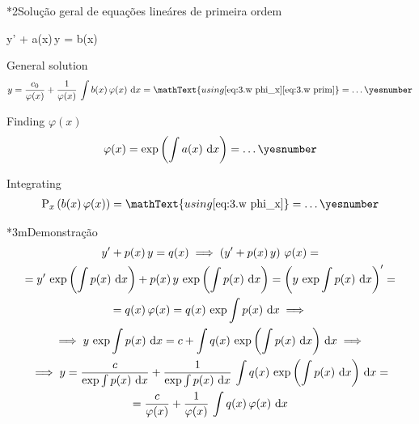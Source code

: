 \documentclass["AM3C-Slides_annotations.tex"]{subfiles}
\begin{document}
\begin{sectionBox}*2{Solução geral de equações lineáres de primeira ordem} %
  \begin{BM}
    y' + a(x)\,y = b(x)
  \end{BM}


  General solution
  \begin{gather*}
    y
    = \frac{c_0}{\varphi(x)}
    + \frac{1  }{\varphi(x)}
    \,\int{b(x)\,\varphi(x)\,\odif{x}}
    = \mathText{using 
      \eqref{eq:3.w phi_x}
      \eqref{eq:3.w prim}
    }
    = \dots
    \yesnumber\label{eq:3.w answer}
  \end{gather*}

  Finding \(\varphi(x)\)
  \begin{gather*}
    \varphi(x) 
    = \exp{\left(
        \int{a(x)\,\odif{x}}
    \right)}
    = \dots
    \yesnumber\label{eq:3.w phi_x}
  \end{gather*}

  Integrating
  \begin{gather*}
    \prim_x{\left(
        b(x)\,\varphi(x)
    \right)}
    = \mathText{using \eqref{eq:3.w phi_x}}
    = \dots
    \yesnumber\label{eq:3.w prim}
  \end{gather*}
  \vspace{-3ex}
  \begin{sectionBox}*3m{Demonstração} %
    \begin{gather*}
      y' + p(x)\,y = q(x)
      \implies
      \left(
        y' + p(x)\,y 
      \right)\,\varphi(x)
      = \\
      = y'\,\exp{\left(\int{p(x)\,\odif{x}}\right)}
      + p(x)\,y\,\exp{\left( \int{p(x)\,\odif{x}} \right)}
      = \left(
        y\,\exp{\int{p(x)\,\odif{x}}}
      \right)'
      = \\
      = q(x)\,\varphi(x)
      = q(x)\,\exp{\int{p(x)\,\odif{x}}}
      \implies \\
      \implies y\,\exp{\int{p(x)\,\odif{x}}}
      = c+\int{
        q(x)\,\exp{\left(\int{p(x)\,\odif{x}}\right)}
        \,\odif{x}
      }
      \implies \\
      \implies y
      = \frac{c}{\exp{\int{p(x)\,\odif{x}}}}
      + \frac{1}{\exp{\int{p(x)\,\odif{x}}}}
      \,\int{
        q(x)\,\exp{\left(\int{p(x)\,\odif{x}}\right)}
        \,\odif{x}
      }
      = \\
      = \frac{c}{\varphi(x)}
      + \frac{1}{\varphi(x)}
      \,\int{q(x)\,\varphi(x)\,\odif{x}}
    \end{gather*}
  \end{sectionBox}

\end{sectionBox}
\end{document}
